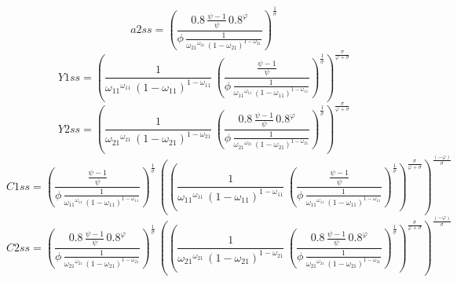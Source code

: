 \begin{dmath*}
a2ss = \left(\frac{0.8\, \frac{{{\psi}}-1}{{{\psi}}}\, 0.8^{{{\varphi}}}}{{{\phi}}\, \frac{1}{{{\omega_{21}}}^{{{\omega_{21}}}}\, \left(1-{{\omega_{21}}}\right)^{1-{{\omega_{21}}}}}}\right)^{\frac{1}{{{\sigma}}}}
\end{dmath*}
\begin{dmath*}
Y1ss = \left(\frac{1}{{{\omega_{11}}}^{{{\omega_{11}}}}\, \left(1-{{\omega_{11}}}\right)^{1-{{\omega_{11}}}}}\, \left(\frac{\frac{{{\psi}}-1}{{{\psi}}}}{{{\phi}}\, \frac{1}{{{\omega_{11}}}^{{{\omega_{11}}}}\, \left(1-{{\omega_{11}}}\right)^{1-{{\omega_{11}}}}}}\right)^{\frac{1}{{{\sigma}}}}\right)^{\frac{{{\sigma}}}{{{\varphi}}+{{\sigma}}}}
\end{dmath*}
\begin{dmath*}
Y2ss = \left(\frac{1}{{{\omega_{21}}}^{{{\omega_{21}}}}\, \left(1-{{\omega_{21}}}\right)^{1-{{\omega_{21}}}}}\, \left(\frac{0.8\, \frac{{{\psi}}-1}{{{\psi}}}\, 0.8^{{{\varphi}}}}{{{\phi}}\, \frac{1}{{{\omega_{21}}}^{{{\omega_{21}}}}\, \left(1-{{\omega_{21}}}\right)^{1-{{\omega_{21}}}}}}\right)^{\frac{1}{{{\sigma}}}}\right)^{\frac{{{\sigma}}}{{{\varphi}}+{{\sigma}}}}
\end{dmath*}
\begin{dmath*}
C1ss = \left(\frac{\frac{{{\psi}}-1}{{{\psi}}}}{{{\phi}}\, \frac{1}{{{\omega_{11}}}^{{{\omega_{11}}}}\, \left(1-{{\omega_{11}}}\right)^{1-{{\omega_{11}}}}}}\right)^{\frac{1}{{{\sigma}}}}\, \left(\left(\frac{1}{{{\omega_{11}}}^{{{\omega_{11}}}}\, \left(1-{{\omega_{11}}}\right)^{1-{{\omega_{11}}}}}\, \left(\frac{\frac{{{\psi}}-1}{{{\psi}}}}{{{\phi}}\, \frac{1}{{{\omega_{11}}}^{{{\omega_{11}}}}\, \left(1-{{\omega_{11}}}\right)^{1-{{\omega_{11}}}}}}\right)^{\frac{1}{{{\sigma}}}}\right)^{\frac{{{\sigma}}}{{{\varphi}}+{{\sigma}}}}\right)^{\frac{\left(-{{\varphi}}\right)}{{{\sigma}}}}
\end{dmath*}
\begin{dmath*}
C2ss = \left(\frac{0.8\, \frac{{{\psi}}-1}{{{\psi}}}\, 0.8^{{{\varphi}}}}{{{\phi}}\, \frac{1}{{{\omega_{21}}}^{{{\omega_{21}}}}\, \left(1-{{\omega_{21}}}\right)^{1-{{\omega_{21}}}}}}\right)^{\frac{1}{{{\sigma}}}}\, \left(\left(\frac{1}{{{\omega_{21}}}^{{{\omega_{21}}}}\, \left(1-{{\omega_{21}}}\right)^{1-{{\omega_{21}}}}}\, \left(\frac{0.8\, \frac{{{\psi}}-1}{{{\psi}}}\, 0.8^{{{\varphi}}}}{{{\phi}}\, \frac{1}{{{\omega_{21}}}^{{{\omega_{21}}}}\, \left(1-{{\omega_{21}}}\right)^{1-{{\omega_{21}}}}}}\right)^{\frac{1}{{{\sigma}}}}\right)^{\frac{{{\sigma}}}{{{\varphi}}+{{\sigma}}}}\right)^{\frac{\left(-{{\varphi}}\right)}{{{\sigma}}}}
\end{dmath*}
